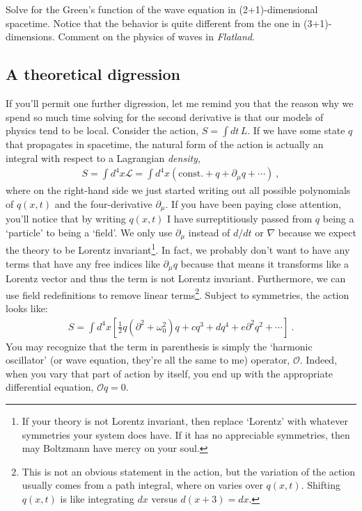 \begin{exercise}
Solve for the Green's function of the wave equation in (2+1)-dimensional spacetime. Notice that the behavior is quite different from the one in (3+1)-dimensions. Comment on the physics of waves in \emph{Flatland}.
\end{exercise}


\subsection{A theoretical digression}

If you'll permit one further digression, let me remind you that the reason why we spend so much time solving for the second derivative is that our models of physics tend to be local. Consider the action, $S = \int dt \, L$. If we have some state $q$ that propagates in spacetime, the natural form of the action is actually an integral with respect to a Lagrangian \emph{density},
\begin{align}
	S = \int d^4x \mathcal L = \int d^4x \left(\text{const.} + q + \partial_\mu q + \cdots\right) \ ,
\end{align}
where on the right-hand side we just started writing out all possible polynomials of $q(x,t)$ and the four-derivative $\partial_\mu$. If you have been paying close attention, you'll notice that by writing $q(x,t)$ I have surreptitiously passed from $q$ being a `particle' to being a `field'. We only use $\partial_\mu$ instead of $d/dt$ or $\nabla$ because we expect the theory to be Lorentz invariant\footnote{If your theory is not Lorentz invariant, then replace `Lorentz' with whatever symmetries your system does have. If it has no appreciable symmetries, then may Boltzmann have mercy on your soul.}. In fact, we probably don't want to have any terms that have any free indices like $\partial_\mu q$ because that means it transforms like a Lorentz vector and thus the term is not Lorentz invariant. Furthermore, we can use field redefinitions to remove linear terms\footnote{This is not an obvious statement in the action, but the variation of the action usually comes from a path integral, where on varies over $q(x,t)$. Shifting $q(x,t)$ is like integrating $dx$ versus $d(x+3) = dx$.}. Subject to symmetries, the action looks like:
\begin{align}
S = \int d^4x \left[\frac{1}{2}q\left(\partial^2 + \omega_0^2\right)q + cq^3 + dq^4 + e\partial^2 q^2 + \cdots \right]	 \ .
\end{align}
You may recognize that the term in parenthesis is simply the `harmonic oscillator' (or wave equation, they're all the same to me) operator, $\mathcal O$. Indeed, when you vary that part of action by itself, you end up with the appropriate differential equation, $\mathcal O q = 0$. 

